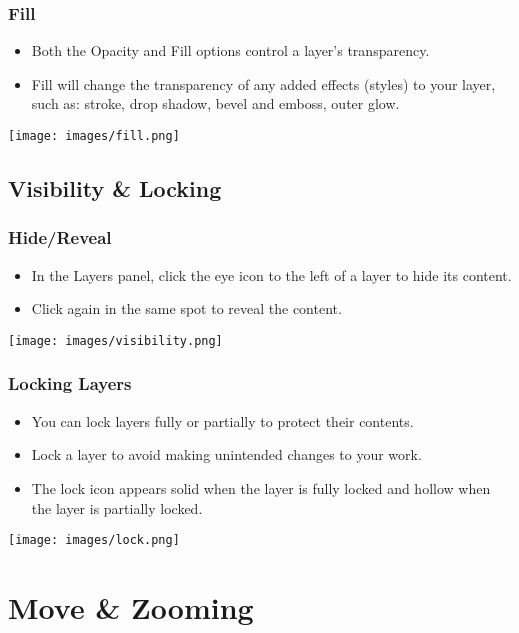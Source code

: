 \documentclass{beamer}
\begin{document}
\begin{frame}
	\frametitle{Fill}
	\begin{itemize}
		\item Both the Opacity and Fill options control a layer's transparency.
		\item Fill will change the transparency of any added effects (styles) to your layer, such as: stroke, drop shadow, bevel and emboss, outer glow.
	\end{itemize}
	\begin{center}
		\texttt{[image: images/fill.png]}
	\end{center}
\end{frame}

		\subsection{Visibility \& Locking}		
\begin{frame}
	\frametitle{Hide/Reveal}
	\begin{itemize}
		\item In the Layers panel, click the eye icon to the left of a layer to hide its content. 
		\item Click again in the same spot to reveal the content.
	\end{itemize}
	\begin{center}
		\texttt{[image: images/visibility.png]}
	\end{center}
\end{frame}

\begin{frame}
	\frametitle{Locking Layers}
	\begin{itemize}
		\item You can lock layers fully or partially to protect their contents.
		\item Lock a layer to avoid making unintended changes to your work.
		\item The lock icon appears solid when the layer is fully locked and hollow when the layer is partially locked.
	\end{itemize}
	\begin{center}
		\texttt{[image: images/lock.png]}
	\end{center}
\end{frame}
	
	
	\section{Move \& Zooming}
\end{document}
